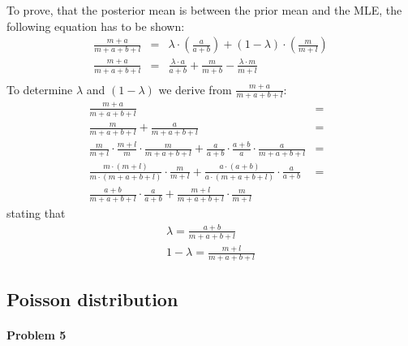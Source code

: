 \documentclass{article}
\begin{document}
To prove, that the posterior mean is between the prior mean and the MLE, the following equation has to be shown:
\begin{eqnarray}
\frac{m+a}{m+a+b+l} &=& \lambda \cdot (\frac{a}{a+b}) + (1-\lambda)\cdot (\frac{m}{m+l})\\
\frac{m+a}{m+a+b+l} &=& \frac{\lambda \cdot a}{a+b} + \frac{m}{m+b} - \frac{\lambda \cdot m}{m+l}\\
\end{eqnarray}
To determine $\lambda$ and $(1-\lambda)$ we derive from $\frac{m+a}{m+a+b+l}$:
\begin{eqnarray}
\frac{m+a}{m+a+b+l} &=&\\
\frac{m}{m+a+b+l} + \frac{a}{m+a+b+l} &=&\\
\frac{m}{m+l} \cdot \frac{m+l}{m} \cdot \frac{m}{m+a+b+l} + \frac{a}{a+b} \cdot \frac{a+b}{a} \cdot \frac{a}{m+a+b+l} &=&\\
\frac{m\cdot(m+l)}{m\cdot(m+a+b+l)} \cdot \frac{m}{m+l} + \frac{a\cdot(a+b)}{a\cdot(m+a+b+l)}\cdot \frac{a}{a+b} &=&\\
\frac{a+b}{m+a+b+l}\cdot\frac{a}{a+b} + \frac{m+l}{m+a+b+l}\cdot\frac{m}{m+l}
\end{eqnarray}
stating that
\begin{eqnarray}
\lambda = \frac{a+b}{m+a+b+l}\\
1-\lambda = \frac{m+l}{m+a+b+l}
\end{eqnarray}
\subsection{Poisson distribution}
\paragraph*{Problem 5}
$\;$ 
\end{document}
